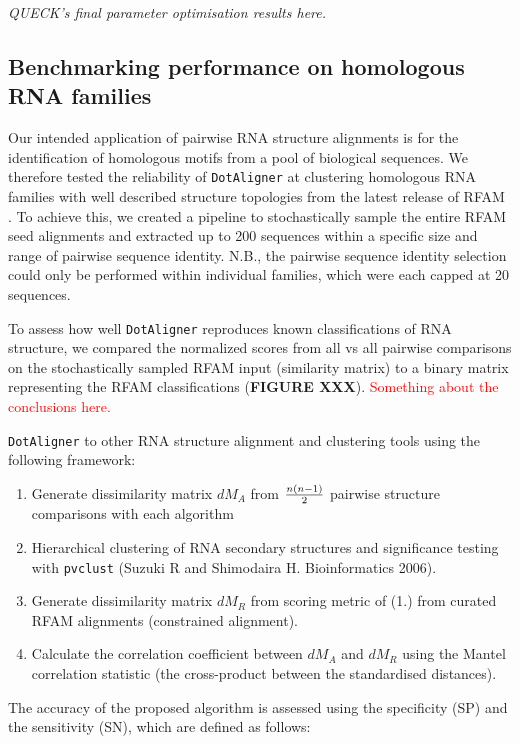 \documentclass[a4paper,twoside]{article}
\newcommand\dotaligner{\texttt{DotAligner}}
\newcommand\pvclust{\texttt{pvclust}}
\newcommand{\RED}[1]{\textcolor{red}{#1}}
\begin{document}
\emph{QUECK's final parameter optimisation results here.}

\subsection{Benchmarking performance on homologous RNA families} 

\noindent Our intended application of pairwise RNA structure alignments is 
for the identification of homologous motifs from a pool of biological sequences. 
We therefore tested the reliability of \dotaligner{} at clustering homologous RNA 
families with well described structure topologies from the latest release of RFAM 
\cite{nawrocki2014rfam}. To achieve this, we created a pipeline to stochastically 
sample the entire RFAM seed alignments and extracted up to 200 sequences 
within a specific size and range of pairwise sequence identity. N.B., the pairwise 
sequence identity selection could only be performed within individual families, 
which were each capped at 20 sequences. 

To assess how well \dotaligner{} reproduces known classifications of RNA structure, 
we compared the normalized scores from all vs all pairwise comparisons on the 
stochastically sampled RFAM input (similarity matrix) to a binary matrix representing
the RFAM classifications (\textbf{FIGURE XXX}). 
\RED{Something about the conclusions here. }


\texttt{DotAligner} to other RNA structure alignment and clustering tools using
the following framework: 

\begin{enumerate}
\item Generate dissimilarity matrix $dM_A$ from ${n(n-1)}\over{2}$ pairwise structure comparisons with each algorithm
\item Hierarchical clustering of RNA secondary structures and significance testing with \pvclust{} (Suzuki R and Shimodaira H. Bioinformatics 2006).
\item Generate dissimilarity matrix $dM_R$ from scoring metric of (1.) from curated RFAM alignments (constrained alignment). 
\item Calculate the correlation coefficient between $dM_A$ and $dM_R$ using the Mantel correlation statistic (the cross-product between the standardised distances). 
\end{enumerate}

\noindent The accuracy of the proposed algorithm is assessed using the
specificity (SP) and the sensitivity (SN), which are defined as follows:
\end{document}
